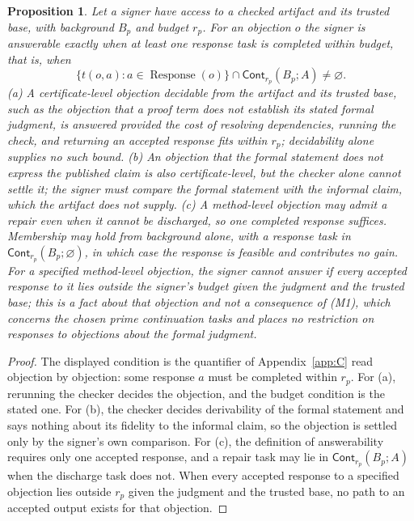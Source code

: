 \documentclass[11pt]{book}
\newtheorem{proposition}[theorem]{Proposition}
\theoremstyle{definition}
\theoremstyle{remark}
\newcommand{\Cont}{\mathsf{Cont}}
\begin{document}
\begin{proposition}\label{prop:answer}
Let a signer have access to a checked artifact and its trusted base, with background $B_p$ and budget $r_p$. For an objection $o$ the signer is answerable exactly when at least one response task is completed within budget, that is, when
\[
\{t(o,a):a\in\operatorname{Response}(o)\}\cap\Cont_{r_p}(B_p;A)\ne\varnothing.
\]
(a) A certificate-level objection decidable from the artifact and its trusted base, such as the objection that a proof term does not establish its stated formal judgment, is answered provided the cost of resolving dependencies, running the check, and returning an accepted response fits within $r_p$; decidability alone supplies no such bound. (b) An objection that the formal statement does not express the published claim is also certificate-level, but the checker alone cannot settle it; the signer must compare the formal statement with the informal claim, which the artifact does not supply. (c) A method-level objection may admit a repair even when it cannot be discharged, so one completed response suffices. Membership may hold from background alone, with a response task in $\Cont_{r_p}(B_p;\varnothing)$, in which case the response is feasible and contributes no gain. For a specified method-level objection, the signer cannot answer if every accepted response to it lies outside the signer's budget given the judgment and the trusted base; this is a fact about that objection and not a consequence of (M1), which concerns the chosen prime continuation tasks and places no restriction on responses to objections about the formal judgment.
\end{proposition}

\begin{proof}
The displayed condition is the quantifier of Appendix~\ref{app:C} read objection by objection: some response $a$ must be completed within $r_p$. For (a), rerunning the checker decides the objection, and the budget condition is the stated one. For (b), the checker decides derivability of the formal statement and says nothing about its fidelity to the informal claim, so the objection is settled only by the signer's own comparison. For (c), the definition of answerability requires only one accepted response, and a repair task may lie in $\Cont_{r_p}(B_p;A)$ when the discharge task does not. When every accepted response to a specified objection lies outside $r_p$ given the judgment and the trusted base, no path to an accepted output exists for that objection.
\end{proof}
\end{document}
